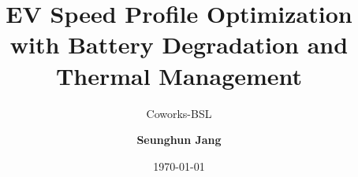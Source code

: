 
\title{EV Speed Profile Optimization with Battery Degradation and Thermal Management}
\subtitle{Coworks-BSL}
\author{\textbf{Seunghun Jang}}
\newcommand{\AuthorInfo}{Ph.D student \\ CCS Graduate School of Mobility, KAIST}
\date{\today}
